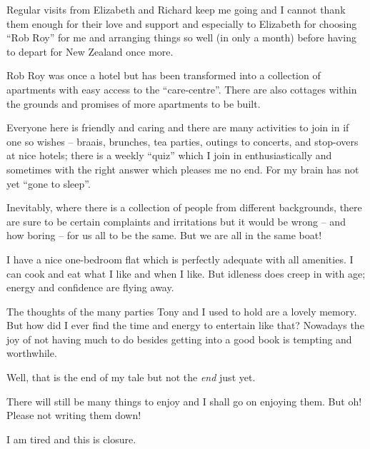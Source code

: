 Regular visits from Elizabeth and Richard keep me going and I cannot
thank them enough for their love and support and especially to
Elizabeth for choosing ``Rob Roy'' for me and arranging things so well
(in only a month) before having to depart for New Zealand once more.

Rob Roy was once a hotel but has been transformed into a collection of
apartments with easy access to the ``care-centre''. There are also
cottages within the grounds and promises of more apartments to be
built.

Everyone here is friendly and caring and there are many activities to
join in if one so wishes -- braais, brunches, tea parties, outings to
concerts, and stop-overs at nice hotels; there is a weekly ``quiz''
which I join in enthusiastically and sometimes with the right answer
which pleases me no end. For my brain has not yet ``gone to sleep''.

Inevitably, where there is a collection of people from different
backgrounds, there are sure to be certain complaints and irritations
but it would be wrong -- and how boring -- for us all to be the
same. But we are all in the same boat!

I have a nice one-bedroom flat which is perfectly adequate with all
amenities. I can cook and eat what I like and when I like. But
idleness does creep in with age; energy and confidence are flying
away.

The thoughts of the many parties Tony and I used to hold are a lovely
memory. But how did I ever find the time and energy to entertain like
that? Nowadays the joy of not having much to do besides getting into a
good book is tempting and worthwhile.

Well, that is the end of my tale but not the \textit{end} just yet.

There will still be many things to enjoy and I shall go on enjoying
them. But oh! Please not writing them down!

I am tired and this is closure.

\clearpage
\thispagestyle{empty}
